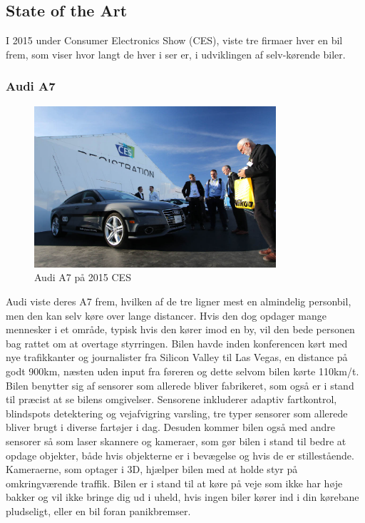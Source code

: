\subsection{State of the Art} 
I 2015 under Consumer Electronics Show (CES), viste tre firmaer hver en bil frem, som viser hvor langt de hver i ser er, i udviklingen af selv-kørende biler.\cite{CES}
\subsubsection{Audi A7}
\begin{figure}[h!]
	\centering
	\includegraphics[width=0.8\textwidth]{images/150106_0345_ces.jpg}
	\caption{Audi A7 på 2015 CES}
	\label{fig:Audi_A7}
\end{figure}
Audi viste deres A7 frem, hvilken af de tre ligner mest en almindelig personbil, men den kan selv køre over lange distancer. Hvis den dog opdager mange mennesker i et område, typisk hvis den kører imod en by, vil den bede personen bag rattet om at overtage styrringen. Bilen havde inden konferencen kørt med nye trafikkanter og journalister fra Silicon Valley til Las Vegas, en distance på godt 900km, næsten uden input fra føreren og dette selvom bilen kørte 110km/t. Bilen benytter sig af sensorer som allerede bliver fabrikeret, som også er i stand til præcist at se bilens omgivelser. Sensorene inkluderer adaptiv fartkontrol, blindspots detektering og vejafvigring varsling, tre typer sensorer som allerede bliver brugt i diverse fartøjer i dag. Desuden kommer bilen også med andre sensorer så som laser skannere og kameraer, som gør bilen i stand til bedre at opdage objekter, både hvis objekterne er i bevægelse og hvis de er stillestående. Kameraerne, som optager i 3D, hjælper bilen med at holde styr på omkringværende traffik. Bilen er i stand til at køre på veje som ikke har høje bakker og vil ikke bringe dig ud i uheld, hvis ingen biler kører ind i din kørebane pludseligt, eller en bil foran panikbremser.
